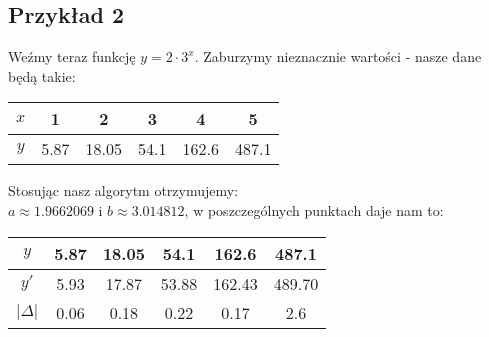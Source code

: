 \documentclass[12pt,a4paper]{article}
\begin{document}
\subsection{Przykład 2}
Weźmy teraz funkcję $y = 2 \cdot 3^x$. Zaburzymy nieznacznie wartości - nasze dane będą takie:\\ 
\begin{center}
	\begin{tabular}{|c|c|c|c|c|c|} \hline
	$x$ & 1 & 2 & 3 & 4 & 5   \\ \hline
	$y$ & 5.87 & 18.05 & 54.1 & 162.6 & 487.1  \\ \hline
	\end{tabular}
\end{center}
Stosując nasz algorytm otrzymujemy:\\
$a \approx 1.9662069$ i $b \approx 3.014812$, w poszczególnych punktach daje nam to:\\
\begin{center}
	\begin{tabular}{|c|c|c|c|c|c|} \hline
	$y$  & 5.87 & 18.05 & 54.1 & 162.6 & 487.1   \\ \hline
	$y'$ & 5.93 & 17.87 & 53.88 & 162.43 & 489.70  \\ \hline
	$|\Delta|$ & 0.06 & 0.18 & 0.22 & 0.17 & 2.6  \\ \hline
	\end{tabular}
\end{center}
\end{document}
